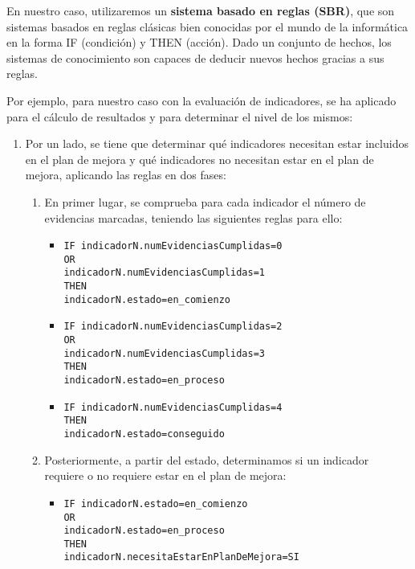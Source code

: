En nuestro caso, utilizaremos un \textbf{sistema basado en reglas (SBR)}, que son sistemas basados
en reglas clásicas bien conocidas por el mundo de la informática en la forma IF
(condición) y THEN (acción). Dado un conjunto de hechos, los sistemas de
conocimiento son capaces de deducir nuevos hechos gracias a sus reglas.

Por ejemplo, para nuestro caso con la evaluación de indicadores, se ha aplicado para el cálculo de resultados y para determinar el nivel de los mismos:
\begin{enumerate}
    \item Por un lado, se tiene que determinar qué indicadores necesitan estar incluidos en el plan de mejora y qué indicadores no necesitan estar en el plan de mejora, aplicando las reglas en dos fases:
    \begin{enumerate}
        \item En primer lugar, se comprueba para cada indicador el número de evidencias marcadas, teniendo las siguientes reglas para ello:
        \begin{itemize}
            \item \texttt{IF indicadorN.numEvidenciasCumplidas=0 \\OR\\ indicadorN.numEvidenciasCumplidas=1 \\THEN\\ indicadorN.estado=en\_comienzo}
            \item \texttt{IF indicadorN.numEvidenciasCumplidas=2 \\OR\\ indicadorN.numEvidenciasCumplidas=3 \\THEN\\ indicadorN.estado=en\_proceso}
            \item \texttt{IF indicadorN.numEvidenciasCumplidas=4 \\THEN\\ indicadorN.estado=conseguido}
        \end{itemize}
        \item Posteriormente, a partir del estado, determinamos si un indicador requiere o no requiere estar en el plan de mejora:
        \begin{itemize}
            \item \texttt{IF indicadorN.estado=en\_comienzo \\OR\\ indicadorN.estado=en\_proceso \\THEN\\ indicadorN.necesitaEstarEnPlanDeMejora=SI}

\end{itemize}
\end{enumerate}
\end{enumerate}
